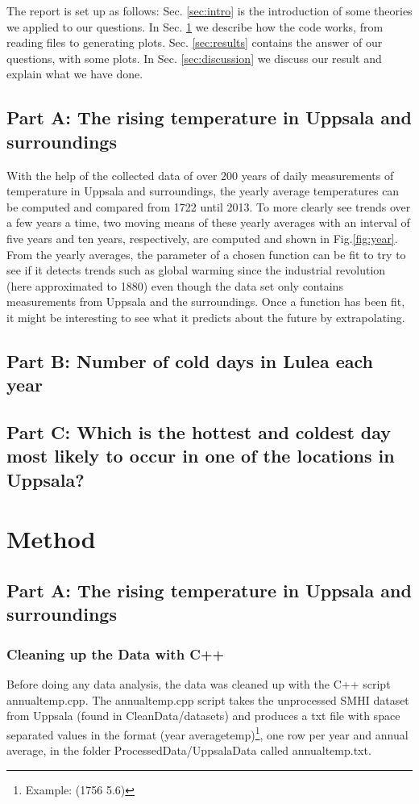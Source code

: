 \documentclass[a4paper]{article}
\begin{document}
The report is set up as follows: Sec. \ref{sec:intro} is the introduction of some theories we applied to our questions. In Sec. \ref{sec:method}  we describe how the code works, from reading files to generating plots. Sec. \ref{sec:results} contains the answer of our questions, with some plots. In Sec. \ref{sec:discussion} we discuss our result and explain what we have done.

\subsection{Part A: The rising temperature in Uppsala and surroundings}
With the help of the collected data of over 200 years of daily measurements of temperature in Uppsala and surroundings, the yearly average temperatures can be computed and compared from 1722 until 2013. To more clearly see trends over a few years a time, two moving means of these yearly averages with an interval of five years and ten years, respectively, are computed and shown in Fig.\ref{fig:year}.  From the yearly averages, the parameter of a chosen function can be fit to try to see if it detects trends such as global warming since the industrial revolution (here approximated to 1880) even though the data set only contains measurements from Uppsala and the surroundings. Once a function has been fit, it might be interesting to see what it predicts about the future by extrapolating.
\subsection{Part B: Number of cold days in Lulea each year} 
\subsection{Part C: Which is the hottest and coldest day most likely to occur in one of the locations in Uppsala?}


\section{Method}\label{sec:method}

\subsection{Part A: The rising temperature in Uppsala and surroundings}
\subsubsection{Cleaning up the Data with C++}
Before doing any data analysis, the data was cleaned up with the C++ script annualtemp.cpp. The annualtemp.cpp script takes the unprocessed SMHI dataset from Uppsala (found in CleanData/datasets) and produces a txt file with space separated values in the format (year averagetemp)\footnote{Example: (1756 5.6)}, one row per year and annual average, in the folder ProcessedData/UppsalaData called annualtemp.txt. 
\end{document}
